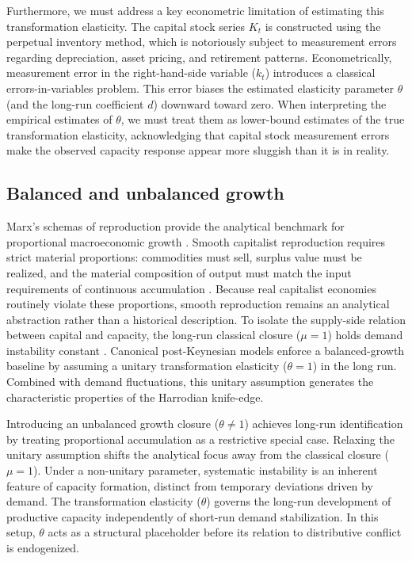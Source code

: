 \documentclass[11pt]{article}
\begin{document}
Furthermore, we must address a key econometric limitation of estimating this transformation elasticity. The capital stock series $K_t$ is constructed using the perpetual inventory method, which is notoriously subject to measurement errors regarding depreciation, asset pricing, and retirement patterns. Econometrically, measurement error in the right-hand-side variable ($k_t$) introduces a classical errors-in-variables problem. This error biases the estimated elasticity parameter $\theta$ (and the long-run coefficient $d$) downward toward zero. When interpreting the empirical estimates of $\theta$, we must treat them as lower-bound estimates of the true transformation elasticity, acknowledging that capital stock measurement errors make the observed capacity response appear more sluggish than it is in reality.

\subsection{Balanced and unbalanced growth}
\label{subsec:balanced_unbalanced_growth}

Marx's schemas of reproduction provide the analytical benchmark for proportional macroeconomic growth \citep{Okishio2022}. Smooth capitalist reproduction requires strict material proportions: commodities must sell, surplus value must be realized, and the material composition of output must match the input requirements of continuous accumulation \citep{Basu2022}. Because real capitalist economies routinely violate these proportions, smooth reproduction remains an analytical abstraction rather than a historical description. To isolate the supply-side relation between capital and capacity, the long-run classical closure ($\mu = 1$) holds demand instability constant \citep{Foley1985}. Canonical post-Keynesian models enforce a balanced-growth baseline by assuming a unitary transformation elasticity ($\theta = 1$) in the long run. Combined with demand fluctuations, this unitary assumption generates the characteristic properties of the Harrodian knife-edge.

Introducing an unbalanced growth closure ($\theta \neq 1$) achieves long-run identification by treating proportional accumulation as a restrictive special case. Relaxing the unitary assumption shifts the analytical focus away from the classical closure ($\mu = 1$). Under a non-unitary parameter, systematic instability is an inherent feature of capacity formation, distinct from temporary deviations driven by demand. The transformation elasticity ($\theta$) governs the long-run development of productive capacity independently of short-run demand stabilization. In this setup, $\theta$ acts as a structural placeholder before its relation to distributive conflict is endogenized.
\end{document}
